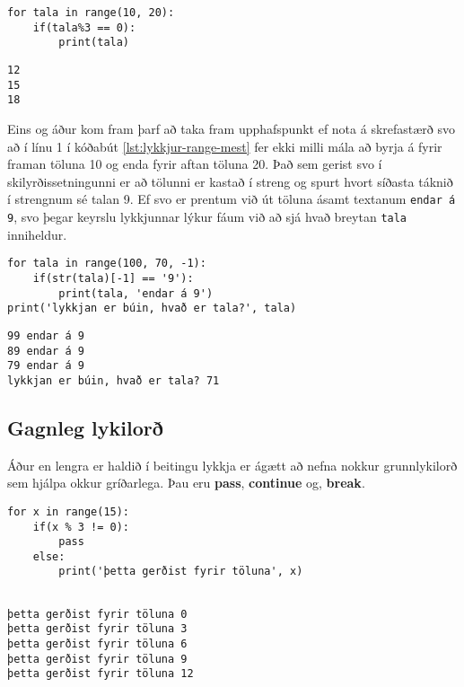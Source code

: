 \lstset{style=venjulegt}
\begin{lstlisting}[caption=for lykkja og range() fallið með skilyrðissetningu, label=lst:lykkjur-range-meira]
for tala in range(10, 20):
	if(tala%3 == 0):
		print(tala)
\end{lstlisting}

\lstset{style=uttak}
\begin{lstlisting}
12
15
18
\end{lstlisting}

Eins og áður kom fram þarf að taka fram upphafspunkt ef nota á skrefastærð svo að í línu 1 í kóðabút \ref{lst:lykkjur-range-mest} fer ekki milli mála að byrja á fyrir framan töluna 10 og enda fyrir aftan töluna 20.
Það sem gerist svo í skilyrðissetningunni er að tölunni er kastað í streng og spurt hvort síðasta táknið í strengnum sé talan 9.
Ef svo er prentum við út töluna ásamt textanum \texttt{endar á 9}, svo þegar keyrslu lykkjunnar lýkur fáum við að sjá hvað breytan \texttt{tala} inniheldur.


\lstset{style=venjulegt}
\begin{lstlisting}[caption=for lykkja range() fallið notað til að telja aftur á bak, label=lst:lykkjur-range-mest]
for tala in range(100, 70, -1):
	if(str(tala)[-1] == '9'):
		print(tala, 'endar á 9')
print('lykkjan er búin, hvað er tala?', tala)
\end{lstlisting}

\lstset{style=uttak}
\begin{lstlisting}
99 endar á 9
89 endar á 9
79 endar á 9
lykkjan er búin, hvað er tala? 71
\end{lstlisting}
\lstset{style=venjulegt}

\subsection{Gagnleg lykilorð}\label{uk:lykkjulykilorð}
	Áður en lengra er haldið í beitingu lykkja er ágætt að nefna nokkur grunnlykilorð sem hjálpa okkur gríðarlega.
	Þau eru \textbf{pass}, \textbf{continue} og, \textbf{break}.

\lstset{style=venjulegt}
\begin{lstlisting}[caption=Lykilorðið pass notað með for lykkju, label=lst:lykkjur-for-pass]
for x in range(15):
	if(x % 3 != 0):
		pass
	else:
		print('þetta gerðist fyrir töluna', x)
		
\end{lstlisting}
\lstset{style=uttak}
\begin{lstlisting}
þetta gerðist fyrir töluna 0
þetta gerðist fyrir töluna 3
þetta gerðist fyrir töluna 6
þetta gerðist fyrir töluna 9
þetta gerðist fyrir töluna 12
\end{lstlisting}

